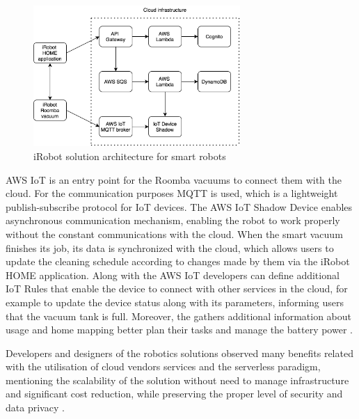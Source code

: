 \begin{figure}[h]
    \centering
    \includegraphics[width=0.7\textwidth]{assets/02-serverless/iRobotArchitecture.png}
    \caption{iRobot solution architecture for smart robots}
    \label{fig:irobot-architecture-diagram}
\end{figure}

AWS IoT is an entry point for the Roomba vacuums to connect them with the cloud. For the communication purposes MQTT is used, which is a lightweight publish-subscribe protocol for IoT devices. The AWS IoT Shadow Device enables asynchronous communication mechanism, enabling the robot to work properly without the constant communications with the cloud. When the smart vacuum finishes its job, its data is synchronized with the cloud, which allows users to update the cleaning schedule according to changes made by them via the iRobot HOME application. Along with the AWS IoT developers can define additional IoT Rules that enable the device to connect with other services in the cloud, for example to update the device status along with its parameters, informing users that the vacuum tank is full. Moreover, the gathers additional information about usage and home mapping better plan their tasks and manage the battery power \cite{ServerlessIoTatiRobot}.

Developers and designers of the robotics solutions observed many benefits related with the utilisation of cloud vendors services and the serverless paradigm, mentioning the scalability of the solution without need to manage infrastructure and significant cost reduction, while preserving the proper level of security and data privacy \cite{AWSIRobotIoT}.






